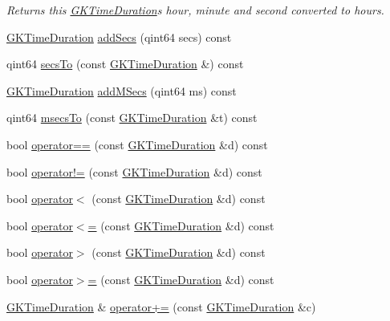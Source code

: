 \begin{DoxyCompactItemize}
\begin{DoxyCompactList}\small\item\em Returns this \hyperlink{classGKTimeDuration}{G\+K\+Time\+Duration}\textquotesingle{}s hour, minute and second converted to hours. \end{DoxyCompactList}\item 
\hyperlink{classGKTimeDuration}{G\+K\+Time\+Duration} \hyperlink{classGKTimeDuration_a37d5bf801b28442afb9242fbcf57d5d5}{add\+Secs} (qint64 secs) const 
\item 
qint64 \hyperlink{classGKTimeDuration_a6532a78b59e29d7b0938db4dfc2e763b}{secs\+To} (const \hyperlink{classGKTimeDuration}{G\+K\+Time\+Duration} \&) const 
\item 
\hyperlink{classGKTimeDuration}{G\+K\+Time\+Duration} \hyperlink{classGKTimeDuration_afda956a8ca2225d69810e45e06727164}{add\+M\+Secs} (qint64 ms) const 
\item 
qint64 \hyperlink{classGKTimeDuration_a0efe6cc980ad7b3f62bc16bc41e0ab82}{msecs\+To} (const \hyperlink{classGKTimeDuration}{G\+K\+Time\+Duration} \&t) const 
\item 
bool \hyperlink{classGKTimeDuration_a02b0b945ea9d2657cc8007c2601e687b}{operator==} (const \hyperlink{classGKTimeDuration}{G\+K\+Time\+Duration} \&d) const 
\item 
bool \hyperlink{classGKTimeDuration_a11ce01f84db5ca2fc5af9e7d5a919ed9}{operator!=} (const \hyperlink{classGKTimeDuration}{G\+K\+Time\+Duration} \&d) const 
\item 
bool \hyperlink{classGKTimeDuration_aa797ef444df5a4cbf83e9b4131244cd7}{operator$<$} (const \hyperlink{classGKTimeDuration}{G\+K\+Time\+Duration} \&d) const 
\item 
bool \hyperlink{classGKTimeDuration_a9ee26e9129f4f0aa6f142a5bb036e3ff}{operator$<$=} (const \hyperlink{classGKTimeDuration}{G\+K\+Time\+Duration} \&d) const 
\item 
bool \hyperlink{classGKTimeDuration_a87863a770684c84b04beabd3063780f5}{operator$>$} (const \hyperlink{classGKTimeDuration}{G\+K\+Time\+Duration} \&d) const 
\item 
bool \hyperlink{classGKTimeDuration_a954acef46595eee00c6e1a6354764b93}{operator$>$=} (const \hyperlink{classGKTimeDuration}{G\+K\+Time\+Duration} \&d) const 
\item 
\hyperlink{classGKTimeDuration}{G\+K\+Time\+Duration} \& \hyperlink{classGKTimeDuration_af81a5ba643ae5509dbad0d8abb6a0a23}{operator+=} (const \hyperlink{classGKTimeDuration}{G\+K\+Time\+Duration} \&c)
\item 

\end{DoxyCompactItemize}
